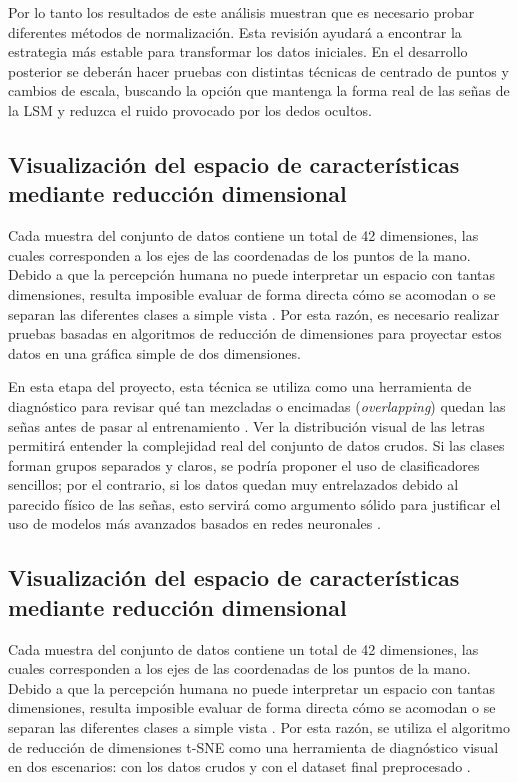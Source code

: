 	Por lo tanto los resultados de este análisis muestran que es necesario probar diferentes métodos de normalización. Esta revisión ayudará a encontrar la estrategia más estable para transformar los datos iniciales. En el desarrollo posterior se deberán hacer pruebas con distintas técnicas de centrado de puntos y cambios de escala, buscando la opción que mantenga la forma real de las señas de la LSM y reduzca el ruido provocado por los dedos ocultos.
	
	
	\subsection{Visualización del espacio de características mediante reducción dimensional}
	
	Cada muestra del conjunto de datos contiene un total de 42 dimensiones, las cuales corresponden a los ejes de las coordenadas de los puntos de la mano. Debido a que la percepción humana no puede interpretar un espacio con tantas dimensiones, resulta imposible evaluar de forma directa cómo se acomodan o se separan las diferentes clases a simple vista \cite{vandermaaten2008visualizing}. Por esta razón, es necesario realizar pruebas basadas en algoritmos de reducción de dimensiones para proyectar estos datos en una gráfica simple de dos dimensiones.
	
	En esta etapa del proyecto, esta técnica se utiliza como una herramienta de diagnóstico para revisar qué tan mezcladas o encimadas (\textit{overlapping}) quedan las señas antes de pasar al entrenamiento \cite{scikit-learn}. Ver la distribución visual de las letras permitirá entender la complejidad real del conjunto de datos crudos. Si las clases forman grupos separados y claros, se podría proponer el uso de clasificadores sencillos; por el contrario, si los datos quedan muy entrelazados debido al parecido físico de las señas, esto servirá como argumento sólido para justificar el uso de modelos más avanzados basados en redes neuronales \cite{geron2022hands}.
	
	
	\subsection{Visualización del espacio de características mediante reducción dimensional}
	
	Cada muestra del conjunto de datos contiene un total de 42 dimensiones, las cuales corresponden a los ejes de las coordenadas de los puntos de la mano. Debido a que la percepción humana no puede interpretar un espacio con tantas dimensiones, resulta imposible evaluar de forma directa cómo se acomodan o se separan las diferentes clases a simple vista \cite{vandermaaten2008visualizing}. Por esta razón, se utiliza el algoritmo de reducción de dimensiones t-SNE como una herramienta de diagnóstico visual en dos escenarios: con los datos crudos y con el dataset final preprocesado \cite{scikit-learn}.
	
